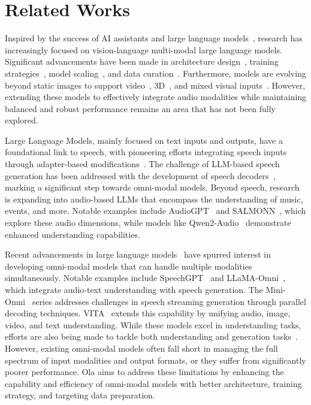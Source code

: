 \section{Related Works}
\label{sec:related_works}

Inspired by the success of AI assistants and large language models~\citep{GPT35,GPT4V,OpenAI_GPT4_2023}, research has increasingly focused on vision-language multi-modal large language models. Significant advancements have been made in architecture design~\citep{alayrac2022flamingo,li2023blip2,liu2024llava,dong2024insight,liu2024efficient}, training strategies~\citep{chen2024internvl,liu2024chain}, model scaling~\citep{li2024llavaov}, and data curation~\citep{laurençon2024cauldron,lu2024deepseek,liu2024chain,yang2024octopus}. Furthermore, models are evolving beyond static images to support video~\citep{lin2023videollava,maaz2023videochatgpt,chen2024sharegpt4video,liu2024oryx}, 3D~\citep{hong20233d,liu2024coarse}, and mixed visual inputs~\citep{ranzinger2024radio,qwen2vl}. However, extending these models to effectively integrate audio modalities while maintaining balanced and robust performance remains an area that has not been fully explored.


Large Language Models, mainly focused on text inputs and outputs, have a foundational link to speech, with pioneering efforts integrating speech inputs through adapter-based modifications~\citep{chen2023xllm,wu2023decoder,fathullah2024prompting}. The challenge of LLM-based speech generation has been addressed with the development of speech decoders~\citep{zhang2023speechgpt,rubenstein2023audiopalm}, marking a significant step towards omni-modal models. Beyond speech, research is expanding into audio-based LLMs that encompass the understanding of music, events, and more. Notable examples include AudioGPT~\citep{huang2024audiogpt} and SALMONN~\citep{tang2023salmonn}, which explore these audio dimensions, while models like Qwen2-Audio~\citep{chu2024qwen2audio} demonstrate enhanced understanding capabilities.

Recent advancements in large language models~\citep{GPT4o,reid2024gemini} have spurred interest in developing omni-modal models that can handle multiple modalities simultaneously.  Notable examples include SpeechGPT~\citep{zhang2023speechgpt} and LLaMA-Omni~\citep{fang2024llamaomni}, which integrate audio-text understanding with speech generation.  The Mini-Omni~\citep{xie2024miniomni2} series addresses challenges in speech streaming generation through parallel decoding techniques.  VITA~\citep{fu2024vita} extends this capability by unifying audio, image, video, and text understanding.  While these models excel in understanding tasks, efforts are also being made to tackle both understanding and generation tasks~\citep{xie2024show,wang2024emu3}.  However, existing omni-modal models often fall short in managing the full spectrum of input modalities and output formats, or they suffer from significantly poorer performance.  Ola aims to address these limitations by enhancing the capability and efficiency of omni-modal models with better architecture, training strategy, and targeting data preparation.